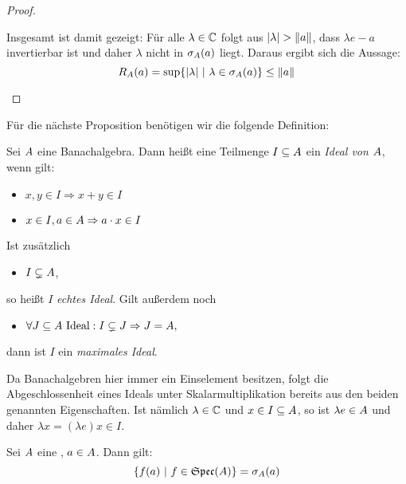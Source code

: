 \begin{proof}
\begin{itemize}
Insgesamt ist damit gezeigt: Für alle $\lambda \in \mathbb{C}$ folgt aus $|\lambda| > \left\lVert a\right\rVert$, dass $\lambda e - a$ invertierbar ist und daher $\lambda$ nicht in $\sigma_A(a)$ liegt. Daraus ergibt sich die Aussage:
	\[R_A(a) = \sup\{|\lambda| ~|~ \lambda \in \sigma_A(a)\} \leq \left\lVert a\right\rVert\]
\end{itemize}	
\end{proof}


Für die nächste Proposition benötigen wir die folgende Definition:

\begin{defn}[Ideal] 
Sei $A$ eine Banachalgebra. Dann heißt eine Teilmenge $I \subseteq A$ ein \emph{Ideal von $A$}, wenn gilt:
\begin{itemize}
	\item $x,y \in I \Rightarrow x+y \in I$
	\item $x \in I, a \in A \Rightarrow a \cdot x \in I$
\end{itemize}
Ist zusätzlich
\begin{itemize}
	\item $I \subsetneq A$,
\end{itemize}
so heißt $I$ \emph{echtes Ideal}. Gilt außerdem noch
\begin{itemize}
	\item $\forall J \subseteq A \text{ Ideal}: I \subsetneq J \Rightarrow J = A,$
\end{itemize}
dann ist $I$ ein \emph{maximales Ideal}.
\end{defn}

\begin{bem}
Da Banachalgebren hier immer ein Einselement besitzen, folgt die Abgeschlossenheit eines Ideals unter Skalarmultiplikation bereits aus den beiden genannten Eigenschaften. Ist nämlich $\lambda \in \mathbb{C}$ und $x \in I \subseteq A$, so ist $\lambda e \in A$ und daher $\lambda x = (\lambda e) x \in I$.
\end{bem}

\begin{prop}\label{prop:Spektrum-von-a}
Sei $A$ eine \CAlg, $a \in A$. Dann gilt:
\[ \{f(a) ~|~ f \in \mathfrak{Spec}(A)\} = \sigma_A(a)\]
\end{prop}

